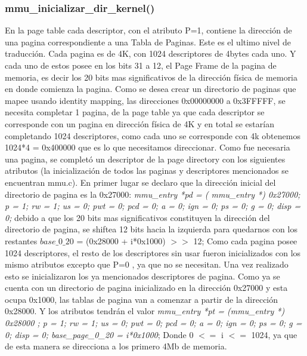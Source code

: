 \subsubsection*{mmu\_inicializar\_dir\_kernel()}
En la page table  cada descriptor, con el atributo P=1, contiene la direcci\'on de una pagina  correspondiente  a una Tabla de Paginas. Este es el ultimo nivel de traducci\'on. Cada pagina es de 4K, con 1024 descriptores de 4bytes cada uno. Y cada uno de estos posee en los  bits 31 a 12,  el Page Frame de la pagina de memoria, es decir los 20 bits mas significativos de la direcci\'on f\'isica de memoria en donde comienza la pagina.\newline
Como se desea crear un directorio de paginas que mapee usando identity mapping, las direcciones 0x00000000 a 0x3FFFFF, se necesita completar 1 pagina, de la page table  ya que cada descriptor se corresponde con un pagina en direcci\'on f\'isica de 4K y en total se estar\'ian completando  1024 descriptores, como cada uno se corresponde con 4k obtenemos 1024*4  = 0x400000 que es  lo que necesitamos direccionar.  Como fue necesaria una pagina,  se completó un  descriptor de la page directory  con los siguientes atributos (la inicializaci\'on de todos las paginas y descriptores mencionados se encuentran mmu.c). En primer lugar se declaro que la direcci\'on inicial del directorio de pagina es la 0x27000: \textit{ mmu\_entry *pd = ( mmu\_entry *) 0x27000; p = 1; rw = 1; us = 0; pwt = 0; pcd = 0; a = 0;  ign = 0; ps = 0; g = 0; disp = 0;} debido a que los 20 bits mas significativos constituyen la  direcci\'on del directorio de pagina, se shiftea 12 bits hacia la izquierda para quedarnos con los restantes $base\_0\_20$ = (0x28000 + i*0x1000) $>>$ 12;  \newline
Como cada pagina posee 1024 descriptores, el resto de los descriptores sin usar fueron inicializados con los mismo atributos excepto que P=0 , ya que no se necesitan.
Una vez realizado esto se inicializaron los ya mencionados descriptores de pagina.  Como ya se cuenta con un directorio de pagina inicializado en la direcci\'on 0x27000 y esta ocupa 0x1000, las tablas de pagina van a comenzar a partir de la direcci\'on 0x28000. Y los atributos tendr\'an el valor \textit{mmu\_entry *pt = (mmu\_entry *) 0x28000 ; p = 1; rw = 1; us = 0; pwt = 0; pcd = 0; a = 0; ign = 0; ps = 0; g = 0; disp = 0; base\_page\_0\_20 = i*0x1000}; Donde 0 $<=$ i $<=$ 1024, ya que de esta manera se direcciona a los primero 4Mb de memoria.\newline \newline

